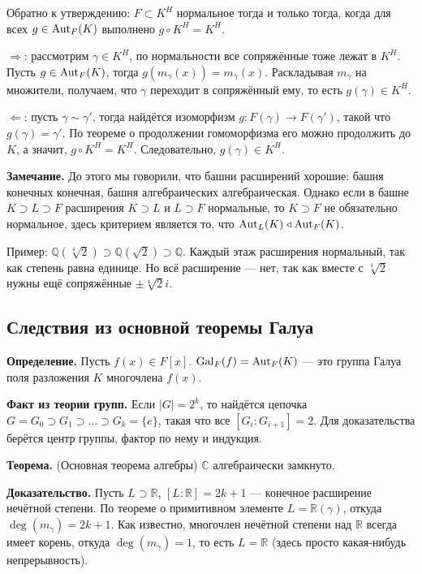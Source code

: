 Обратно к утверждению: $F \subset K^H$ нормальное тогда и только тогда, когда для всех $g \in \operatorname{Aut}_F(K)$ выполнено $g \circ K^H = K^H$.

$\Rightarrow$: рассмотрим $\gamma \in K^H$, по нормальности все сопряжённые тоже лежат в $K^H$.
Пусть $g \in \operatorname{Aut}_F(K)$, тогда $g(m_\gamma(x)) = m_\gamma(x)$.
Раскладывая $m_\gamma$ на множители, получаем, что $\gamma$ переходит в сопряжённый ему, то есть $g(\gamma) \in K^H$.

$\Leftarrow$: пусть $\gamma \sim \gamma'$, тогда найдётся изоморфизм $g: F(\gamma) \to F(\gamma')$, такой что $g(\gamma) = \gamma'$.
По теореме о продолжении гомоморфизма его можно продолжить до $K$, а значит, $g \circ K^H = K^H$.
Следовательно, $g(\gamma) \in K^H$.

\QED

\textbf{Замечание.} До этого мы говорили, что башни расширений хорошие: башня конечных конечная, башня алгебраических алгебраическая.
Однако если в башне $K \supset L \supset F$ расширения $K \supset L$ и $L \supset F$ нормальные, то $K \supset F$ не обязательно нормальное, здесь критерием является то, что $\operatorname{Aut}_L(K) \triangleleft \operatorname{Aut}_F(K)$.

Пример: $\mathbb Q(\sqrt[4]{2}) \supset \mathbb Q(\sqrt 2) \supset \mathbb Q$.
Каждый этаж расширения нормальный, так как степень равна единице.
Но всё расширение --- нет, так как вместе с $\sqrt[4]{2}$ нужны ещё сопряжённые $\pm \sqrt[4]{2} i$.

\subsection{Следствия из основной теоремы Галуа}
\textbf{Определение.} Пусть $f(x) \in F[x]$. $\operatorname{Gal}_F(f) = \operatorname{Aut}_F(K)$ --- это группа Галуа поля разложения $K$ многочлена $f(x)$.

\textbf{Факт из теории групп.} Если $|G| = 2^k$, то найдётся цепочка $G = G_0 \supset G_1 \supset \dots \supset G_k = \{e\}$, такая что все $[G_i : G_{i+1}] = 2$.
Для доказательства берётся центр группы, фактор по нему и индукция.

\textbf{Теорема.} (Основная теорема алгебры) $\mathbb C$ алгебраически замкнуто.

\textbf{Доказательство.} Пусть $L \supset \mathbb R$, $[L : \mathbb R] = 2k + 1$ --- конечное расширение нечётной степени.
По теореме о примитивном элементе $L = \mathbb R(\gamma)$, откуда $\deg(m_\gamma) = 2k + 1$.
Как известно, многочлен нечётной степени над $\mathbb R$ всегда имеет корень, откуда $\deg(m_\gamma) = 1$, то есть $L = \mathbb R$ (здесь просто какая-нибудь непрерывность).


